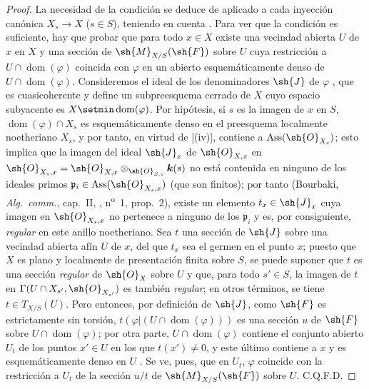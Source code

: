 \begin{proof}
La necesidad de la condición se deduce de  aplicado a cada inyección canónica $X_s\to X$ ($s\in S$), teniendo en cuenta .
Para ver que la condición es suficiente, hay que probar que para todo $x\in X$ existe una vecindad abierta $U$ de $x$ en $X$ y una sección de $\sh{M}_{X/S}(\sh{F})$ sobre $U$ cuya restricción a $U\cap\operatorname{dom}(\varphi)$ coincida con $\varphi$ en un abierto esquemáticamente denso de $U\cap\operatorname{dom}(\varphi)$.
Consideremos el ideal de los denominadores $\sh{J}$ de $\varphi$ , que es cuasicoherente y define un subpreesquema cerrado de $X$ cuyo espacio subyacente es $X\setmin\operatorname{dom}(\varphi)$.
Por hipótesis, si $s$ es la imagen de $x$ en $S$, $\operatorname{dom}(\varphi)\cap X_s$ es esquemáticamente denso en el preesquema localmente noetheriano $X_s$, y por tanto, en virtud de [(iv)], contiene a $\operatorname{Ass}(\sh{O}_{X_s})$; esto implica que la imagen del ideal $\sh{J}_x$ de $\sh{O}_{X,x}$ en $\sh{O}_{X_s,x}=\sh{O}_{X,x}\otimes_{\sh{O}_{S,s}}\boldsymbol{k}(s)$ no está contenida en ninguno de los ideales primos $\mathfrak{p}_i\in\operatorname{Ass}(\sh{O}_{X_s,x})$ (que son finitos); por tanto (Bourbaki, \emph{Alg.~comm.}, cap.~II, , n\textsuperscript{o}~1, prop.~2), existe un elemento $t_x\in\sh{J}_x$ cuya imagen en $\sh{O}_{X_s,x}$ no pertenece a ninguno de los $\mathfrak{p}_i$ y es, por consiguiente, \emph{regular} en este anillo noetheriano.
Sea $t$ una sección de $\sh{J}$ sobre una vecindad abierta afín $U$ de $x$, del que $t_x$ sea el germen en el punto $x$; puesto que $X$ es plano y localmente de presentación finita sobre $S$, se puede suponer  que $t$ es una sección \emph{regular} de $\sh{O}_X$ sobre $U$ y que, para todo $s'\in S$, la imagen de $t$ en $\Gamma(U\cap X_{s'},\sh{O}_{X_{s'}})$ es también \emph{regular}; en otros términos, se tiene $t\in T_{X/S}(U)$.
Pero entonces, por definición de $\sh{J}$, como $\sh{F}$ es estrictamente sin torsión, $t(\varphi|(U\cap\operatorname{dom}(\varphi)))$ es una sección $u$ de $\sh{F}$ sobre $U\cap\operatorname{dom}(\varphi)$; por otra parte, $U\cap\operatorname{dom}(\varphi)$ contiene el conjunto abierto $U_t$ de los puntos $x'\in U$ en los que $t(x')\neq0$, y este último contiene a $x$ y es esquemáticamente denso en $U$ .
Se ve, pues, que en $U_t$, $\varphi$ coincide con la restricción a $U_t$ de la sección $u/t$ de $\sh{M}_{X/S}(\sh{F})$ sobre $U$.
C.Q.F.D.
\end{proof}

